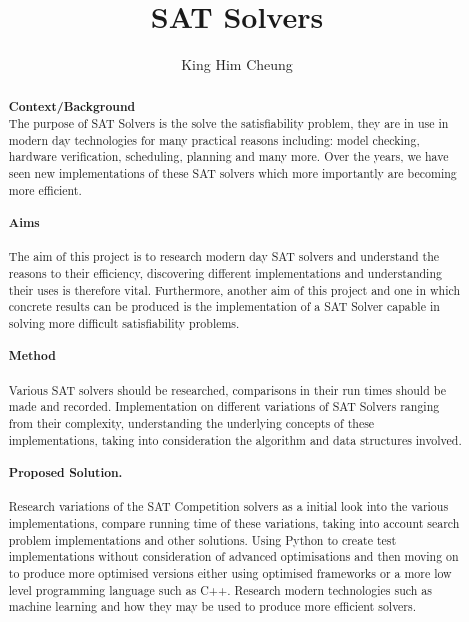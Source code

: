 \documentclass[12pt,a4paper]{article}
\title{SAT Solvers}
\author{King Him Cheung}
\date{}
\begin{document}
\maketitle

\begin{abstract}\newline\newline
{\bf Context/Background}\newline \\
The purpose of SAT Solvers is the solve the satisfiability problem, they are in use in modern day technologies for many practical reasons including: model checking, hardware verification, scheduling, planning and many more. Over the years, we have seen new implementations of these SAT solvers which more importantly are becoming more efficient.  
\\\\
{\bf Aims}\\\\
The aim of this project is to research modern day SAT solvers and understand the reasons to their efficiency, discovering different implementations and understanding their uses is therefore vital. Furthermore, another aim of this project and one in which concrete results can be produced is the implementation of a SAT Solver capable in solving more difficult satisfiability problems.
\\\\
{\bf Method}\\\\
Various SAT solvers should be researched, comparisons in their run times should be made and recorded. Implementation on different variations of SAT Solvers ranging from their complexity, understanding the underlying concepts of these implementations, taking into consideration the algorithm and data structures involved.   
\\\\
{\bf Proposed Solution.}\\\\
Research variations of the SAT Competition solvers as a initial look into the various implementations, compare running time of these variations, taking into account search problem implementations and other solutions.\newline
Using Python to create test implementations without consideration of advanced optimisations and then moving on to produce more optimised versions either using optimised frameworks or a more low level programming language such as C++. \newline
Research modern technologies such as machine learning and how they may be used to produce more efficient solvers.



\end{abstract}
\end{document}
